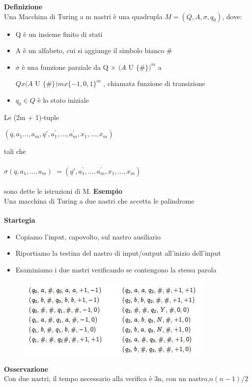 \textbf{Definizione}\\
Una Macchina di Turing a m nastri è una quadrupla $M = (Q, A, \sigma, q_0)$,
dove:
\begin{itemize}
    \item Q è un insieme finito di stati 
    \item A è un alfabeto, cui si aggiunge il simbolo bianco \#
    \item $\sigma$ è una funzione parziale da Q × $(A$ U $\{\#\})^m$ a 
    
    $Q x (A$ U $\{\#\}) m x \{-1, 0, 1\}^m$ , chiamata funzione di transizione
    
    \item $q_0 \in Q$ è lo stato iniziale
\end{itemize}
Le (2m + 1)-tuple
\begin{center}
    $(q, a_1 ..., a_m, q', a^{'}_1,..., a^{'}_m , x_1,..., x_m)$
\end{center}
tali che\\\\
$\sigma(q, a_1, ... , a_m )$ $= (q', a^{'}_1,..., a^{'}_m , x_1,..., x_m)$
\\\\sono dette le istruzioni di M.
\newpage
\textbf{Esempio}\\
Una macchina di Turing a due nastri che accetta le palindrome\\\\
\textbf{Startegia}
\begin{itemize}
    \item Copiamo l’input, capovolto, sul nastro ausiliario
    \item Riportiamo la testina del nastro di input/output all’inizio dell’input
    \item Esaminiamo i due nastri verificando se contengono la stessa parola
\end{itemize}
\begin{figure}[htp]
    \centering
    \includegraphics[scale=0.8]{tesi_stile/img/foto2cap16.png}
\end{figure}
\textbf{Osservazione}\\
Con due nastri, il tempo necessario alla verifica è 3n, con un nastro,$n(n-1)/2$
